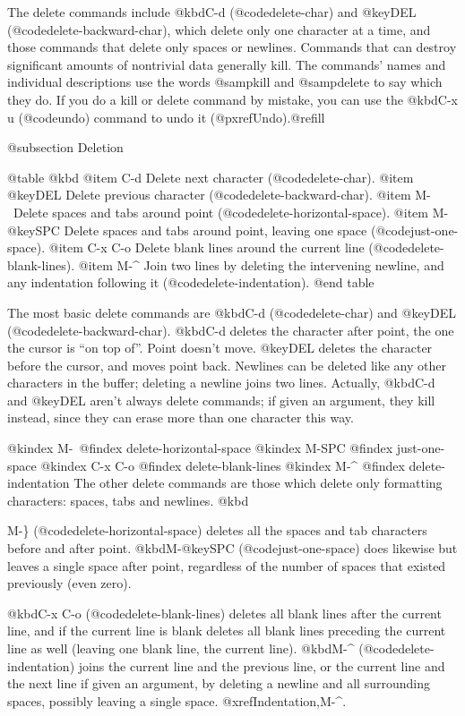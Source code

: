 {{{{{{{  The delete commands include @kbd{C-d} (@code{delete-char}) and
@key{DEL} (@code{delete-backward-char}), which delete only one character at
a time, and those commands that delete only spaces or newlines.  Commands
that can destroy significant amounts of nontrivial data generally kill.
The commands' names and individual descriptions use the words @samp{kill}
and @samp{delete} to say which they do.  If you do a kill or delete command
by mistake, you can use the @kbd{C-x u} (@code{undo}) command to undo it
(@pxref{Undo}).@refill

@subsection Deletion

@table @kbd
@item C-d
Delete next character (@code{delete-char}).
@item @key{DEL}
Delete previous character (@code{delete-backward-char}).
@item M-\
Delete spaces and tabs around point (@code{delete-horizontal-space}).
@item M-@key{SPC}
Delete spaces and tabs around point, leaving one space
(@code{just-one-space}).
@item C-x C-o
Delete blank lines around the current line (@code{delete-blank-lines}).
@item M-^
Join two lines by deleting the intervening newline, and any indentation
following it (@code{delete-indentation}).
@end table

  The most basic delete commands are @kbd{C-d} (@code{delete-char}) and
@key{DEL} (@code{delete-backward-char}).  @kbd{C-d} deletes the character
after point, the one the cursor is ``on top of''.  Point doesn't move.
@key{DEL} deletes the character before the cursor, and moves point back.
Newlines can be deleted like any other characters in the buffer; deleting a
newline joins two lines.  Actually, @kbd{C-d} and @key{DEL} aren't always
delete commands; if given an argument, they kill instead, since they can
erase more than one character this way.

@kindex M-\
@findex delete-horizontal-space
@kindex M-SPC
@findex just-one-space
@kindex C-x C-o
@findex delete-blank-lines
@kindex M-^
@findex delete-indentation
  The other delete commands are those which delete only formatting
characters: spaces, tabs and newlines.  @kbd{M-\} (@code{delete-horizontal-space})
deletes all the spaces and tab characters before and after point.
@kbd{M-@key{SPC}} (@code{just-one-space}) does likewise but leaves a single
space after point, regardless of the number of spaces that existed
previously (even zero).

  @kbd{C-x C-o} (@code{delete-blank-lines}) deletes all blank lines after
the current line, and if the current line is blank deletes all blank lines
preceding the current line as well (leaving one blank line, the current
line).  @kbd{M-^} (@code{delete-indentation}) joins the current line and
the previous line, or the current line and the next line if given an
argument, by deleting a newline and all surrounding spaces, possibly
leaving a single space.  @xref{Indentation,M-^}.

}}}}}}}}
